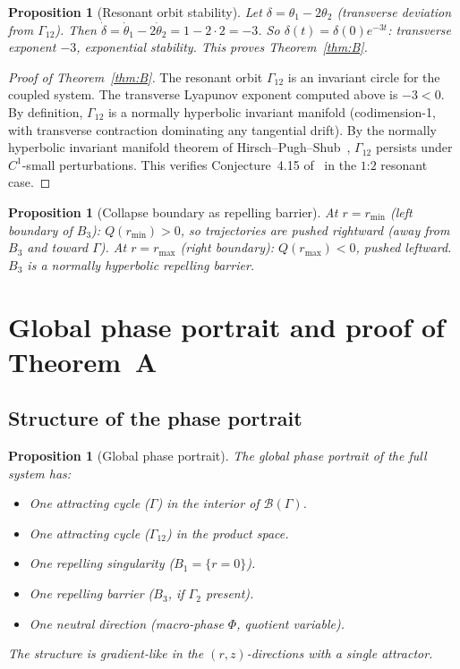 \documentclass[12pt, oneside]{book}
\theoremstyle{plain}
\newtheorem{proposition}[theorem]{Proposition}
\theoremstyle{definition}
\theoremstyle{remark}
\newcommand{\Orb}{\Gamma}
\newcommand{\cB}{\mathcal{B}}
\begin{document}
\begin{proposition}[Resonant orbit stability]\label{prop:resstable}
Let $\delta=\theta_1-2\theta_2$ (transverse deviation from $\Orb_{12}$).
Then $\dot\delta=\dot\theta_1-2\dot\theta_2=1-2\cdot 2=-3$.
So $\delta(t)=\delta(0)e^{-3t}$: transverse exponent $-3$,
exponential stability. This proves Theorem~\ref{thm:B}.
\end{proposition}

\begin{proof}[Proof of Theorem~\ref{thm:B}]
The resonant orbit $\Orb_{12}$ is an invariant circle for the coupled
system. The transverse Lyapunov exponent computed above is $-3<0$.
By definition, $\Orb_{12}$ is a normally hyperbolic invariant manifold
(codimension-1, with transverse contraction dominating any tangential
drift). By the normally hyperbolic invariant manifold theorem of
Hirsch--Pugh--Shub~\cite{HPS}, $\Orb_{12}$ persists under
$C^1$-small perturbations. This verifies Conjecture~4.15
of~\cite{Paper1} in the $1$:$2$ resonant case.
\end{proof}

\begin{proposition}[Collapse boundary as repelling barrier]\label{prop:collapse}
At $r=r_{\min}$ (left boundary of $B_3$): $Q(r_{\min})>0$, so
trajectories are pushed rightward (away from $B_3$ and toward $\Orb$).
At $r=r_{\max}$ (right boundary): $Q(r_{\max})<0$, pushed leftward.
$B_3$ is a normally hyperbolic repelling barrier.
\end{proposition}

\section{Global phase portrait and proof of Theorem~A}\label{sec:portrait}

\subsection{Structure of the phase portrait}

\begin{proposition}[Global phase portrait]\label{prop:portrait}
The global phase portrait of the full system has:
\begin{itemize}[leftmargin=*]
  \item One attracting cycle ($\Orb$) in the interior of $\cB(\Orb)$.
  \item One attracting cycle ($\Orb_{12}$) in the product space.
  \item One repelling singularity ($B_1=\{r=0\}$).
  \item One repelling barrier ($B_3$, if $\Orb_2$ present).
  \item One neutral direction (macro-phase $\Phi$, quotient variable).
\end{itemize}
The structure is gradient-like in the $(r,z)$-directions with a
single attractor.
\end{proposition}
\end{document}
